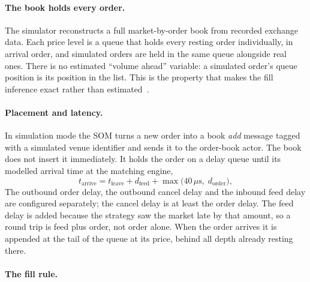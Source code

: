 \paragraph{The book holds every order.}

The simulator reconstructs a full market-by-order book from recorded exchange data. Each price
level is a queue that holds every resting order individually, in arrival order, and simulated
orders are held in the same queue alongside real ones. There is no estimated ``volume ahead''
variable: a simulated order's queue position is its position in the list. This is the property
that makes the fill inference exact rather than estimated~\citep{maciejewski_shadow}.

\paragraph{Placement and latency.}

In simulation mode the SOM turns a new order into a book \emph{add} message tagged with a
simulated venue identifier and sends it to the order-book actor. The book does not insert it
immediately. It holds the order on a delay queue until its modelled arrival time at the matching
engine,
\begin{equation}
  t_{\text{arrive}} = t_{\text{leave}} + d_{\text{feed}} + \max\big(40\,\mu\text{s},\; d_{\text{order}}\big),
\end{equation}
The outbound order delay, the outbound cancel delay and the inbound feed delay are configured
separately; the cancel delay is at least the order delay. The feed delay is added because the strategy saw the market late by that amount, so a
round trip is feed plus order, not order alone. When the order arrives it is appended at the tail
of the queue at its price, behind all depth already resting there.

\paragraph{The fill rule.}

